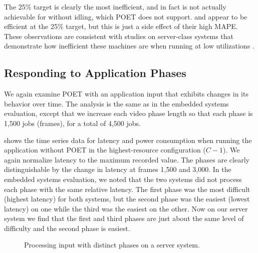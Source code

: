 The 25\% target is clearly the most inefficient, and in fact is not actually achievable for  without idling, which POET does not support.
 and  appear to be efficient at the 25\% target, but this is just a side effect of their high MAPE.
These observations are consistent with studies on server-class systems that demonstrate how inefficient these machines are when running at low utilizations \cite{google,pupil}.


\subsection{Responding to Application Phases}

We again examine POET with an application input that exhibits changes in its behavior over time.
The analysis is the same as in the embedded systems evaluation, except that we increase each video phase length so that each phase is 1,500 jobs (frames), for a total of 4,500 jobs.

 shows the time series data for latency and power consumption when running the application without POET in the highest-resource configuration ($C-1$).
We again normalize latency to the maximum recorded value.
The phases are clearly distinguishable by the change in latency at frames 1,500 and 3,000.
In the embedded systems evaluation, we noted that the two systems did not process each phase with the same relative latency.
The first phase was the most difficult (highest latency) for both systems, but the second phase was the easiest (lowest latency) on one while the third was the easiest on the other.
Now on our server system we find that the first and third phases are just about the same level of difficulty and the second phase is easiest.

\begin{figure}[t]
  \centering
  \newline
  \caption{Processing  input with distinct phases on a server system.}
  \label{fig:poet-server-phases}
\end{figure}

